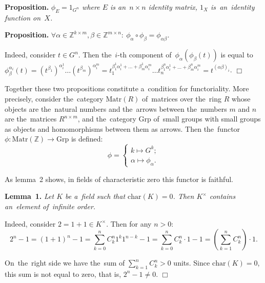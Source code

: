 \documentclass[twoside]{article}
\begin{document}
\medskip\noindent\textbf{Proposition.}\emph{
    $\phi_{E} = 1_{G^n}$ where $E$ is an~$n \times n$ identity matrix, $1_X$ is~an~identity function on~$X$.
}

\medskip\noindent\textbf{Proposition.}\emph{
    $
        \forall \alpha \in \mathbb{Z}^{k \times m}, \beta \in \mathbb{Z}^{m \times n}{:}\ \phi_\alpha \circ \phi_\beta = \phi_{\alpha \beta}
    $.
}\medskip

    Indeed, consider $t \in G^n$. Then the~$i$-th component of~$\phi_\alpha(\phi_\beta(t))$
    is equal to $\phi_\beta^{\alpha_i}(t) = (t^{\beta_1})^{\alpha_i^1} \ldots (t^{\beta_m})^{\alpha_i^m}
                                          = t_1^{\beta_1^1 \alpha_i^1 + \ldots + \beta_m^1 \alpha_i^m}
                                            \ldots
                                            t_n^{\beta_1^n \alpha_i^1 + \ldots + \beta_m^n \alpha_i^m}
                                          = t^{(\alpha \beta)_i}$.
\hfill$\Box$\medskip

Together these two propositions constitute a~condition for functoriality. More precisely, consider the~category $\mathrm{Matr}(R)$ of~matrices over the~ring $R$
whose objects are the~natural numbers and the~arrows between the~numbers $m$ and $n$ are the~matrices $R^{n \times m}$,
and the~category $\mathrm{Grp}$ of~small groups with small groups as objects and homomorphisms between them as arrows.
Then the~functor $\phi : \mathrm{Matr}(\mathbb{Z}) \rightarrow \mathrm{Grp}$ is defined:
$$
    \phi = \begin{cases}
        k \mapsto G^k; \\
        \alpha \mapsto \phi_\alpha.
    \end{cases}
$$

As lemma~2 shows, in fields of characteristic zero this functor is faithful.

\medskip\noindent\textbf{Lemma~1.}\emph{
    Let $K$ be a~field such that $\mathrm{char}(K) = 0$.
    Then $K^\times$ contains an~element of~infinite order.
}\medskip

    Indeed, consider $2 = 1 + 1 \in K^\times$. Then for any $n > 0$:
    $$
        2^n - 1 = (1 + 1)^n - 1 = \sum_{k = 0}^n C^n_k 1^k 1^{n - k} - 1
                                = \sum_{k = 0}^n C^n_k \cdot 1 - 1
                                = \left(\sum_{k = 1}^n C^n_k \right) \cdot 1.
    $$

    On~the~right side we have the~sum of $\sum_{k = 1}^n C^n_k > 0$ units. Since $\mathrm{char}(K) = 0$,
    this sum is not equal to zero, that is, $2^n - 1 \neq 0$.
\hfill$\Box$\medskip
\end{document}
